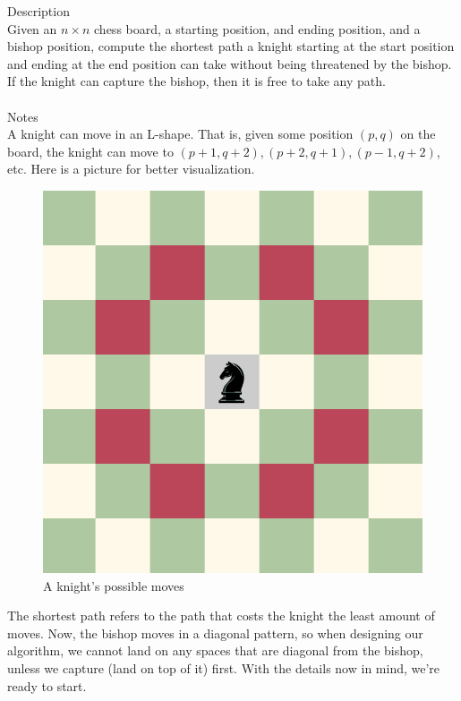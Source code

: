 \documentclass[11pt]{exam}
\begin{document}
{\large Description}\\
Given an $n\times n$ chess board, a starting position, and ending position,
and a bishop position, compute the shortest path a knight starting at the
start position and ending at the end position can take without being
threatened by the bishop. If the knight can capture the bishop, then
it is free to take any path.\\\\
{\large Notes}\\
A knight can move in an L-shape. That is, given some position $(p,q)$ on
the board, the knight can move to $(p+1,q+2), (p+2,q+1), (p-1,q+2)$, etc.
Here is a picture for better visualization.
\begin{figure}[H]
	\centering
	\includegraphics[width=\linewidth]{knight_moves.png}
	\caption{A knight's possible moves}
\end{figure}
The shortest path refers to the path that costs the knight the least
amount of moves. Now, the bishop moves in a diagonal pattern, so when
designing our algorithm, we cannot land on any spaces that are diagonal
from the bishop, unless we capture (land on top of it) first.
With the details now in mind, we're ready to start.

\newpage
\end{document}
